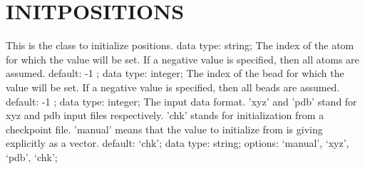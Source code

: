 \section{INITPOSITIONS}
\label{INITPOSITIONS}
\begin{ipifield}{}%
{This is the class to initialize positions.}%
{data type: string; }%
{%
{The index of the atom for which the value will be set. If a negative value is specified, then all atoms are assumed.}%
{default:  -1 ; data type: integer; }%
%
{The index of the bead for which the value will be set. If a negative value is specified, then all beads are assumed.}%
{default:  -1 ; data type: integer; }%
%
{The input data format. 'xyz' and 'pdb' stand for xyz and pdb input files respectively. 'chk' stands for initialization from a checkpoint file. 'manual' means that the value to initialize from is giving explicitly as a vector.}%
{default: `chk'; data type: string; options: `manual', `xyz', `pdb', `chk'; }%
}
\end{ipifield}
